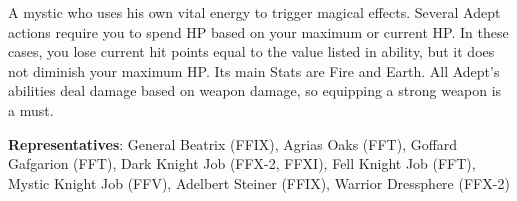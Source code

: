 \begin{jobdesc}[name=pjob-adept]
    A mystic who uses his own vital energy to trigger magical effects. Several Adept actions require you to spend HP based on your maximum or current HP\@. In these cases, you lose current hit points equal to the value listed in ability, but it does not diminish your maximum HP\@. Its main Stats are Fire and Earth. All Adept’s abilities deal damage based on weapon damage, so equipping a strong weapon is a must.\pc%

    \textbf{Representatives}:
    General Beatrix (FFIX),
    Agrias Oaks (FFT),
    Goffard Gafgarion (FFT),
    Dark Knight Job (FFX-2, FFXI),
    Fell Knight Job (FFT),
    Mystic Knight Job (FFV),
    Adelbert Steiner (FFIX),
    Warrior Dressphere (FFX-2)%
    \pc%

    \jobstats[hpa=4x,hpb=5x,hpc=6x,hpd=7x,mpa=1x,mpb=2x,mpc=3x,armor=Heavy,
    weapons=Claws/Gloves \\ Weapons \& Shields \\ Heavy Weapons \\ Katanas \\  Wands \\ Staves ]
\end{jobdesc}

